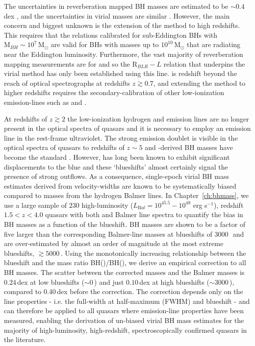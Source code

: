 The uncertainties in reverberation mapped BH masses are estimated to be $\sim 0.4$\,dex \citep[e.g.][]{peterson10}, and the uncertainties in virial masses are similar \citep[e.g.][]{vestergaard06}.
However, the main concern and biggest unknown is the extension of the method to high redshifts. 
This requires that the relations calibrated for sub-Eddington BHs with ${\mathrm M_{BH}}\sim10^7\,{\mathrm M}_\odot$ are valid for BHs with masses up to $10^{10}\,{\mathrm M}_\odot$ that are radiating near the Eddington luminosity. 
Furthermore, the vast majority of reverberation mapping measurements are for \hb and so the ${\mathrm R_{BLR}-L}$ relation that underpins the virial method has only been established using this line.
\hb is redshift beyond the reach of optical spectrographs at redshifts $z \gtrsim 0.7$, and extending the method to higher redshifts requires the secondary-calibration of other low-ionization emission-lines such as \ha and  \citep[e.g.][]{vestergaard02,mclure02,wu04,kollmeier06,onken08,wang09,rafiee11}.

At redshifts of $z\gtrsim 2$ the low-ionization hydrogen and  emission lines are no longer present in the optical spectra of quasars and it is necessary to employ an emission line in the rest-frame ultraviolet.  
The strong  emission doublet is visible in the optical spectra of quasars to redshifts of $z\sim5$ and -derived BH masses have become the standard \citep[e.g.][]{vestergaard06,park13}.
However,  has long been known to exhibit significant displacements to the blue and these `blueshifts' almost certainly signal the presence of strong outflows.
As a consequence, single-epoch virial BH mass estimates derived from  velocity-widths are known to be systematically biased compared to masses from the hydrogen Balmer lines. 
In Chapter~\ref{ch:bhmass}, we use a large sample of $230$ high-luminosity ($L_{\mathrm Bol} = 10^{45.5}-10^{48}$ erg s$^{-1}$), redshift $1.5 < z < 4.0$ quasars with both  and Balmer line spectra to quantify the bias in  BH masses as a function of the  blueshift. 
 BH masses are shown to be a factor of five larger than the corresponding Balmer-line masses at  blueshifts of $3000$\,\kms\, and are over-estimated by almost an order of magnitude at the most extreme blueshifts, $\gtrsim 5000$\,\kms.
Using the monotonically increasing relationship between the  blueshift and the mass ratio BH()/BH(\hans), we derive an empirical correction to all  BH masses.
The scatter between the corrected  masses and the Balmer masses is $0.24$\,dex at low  blueshifts ($\sim0$\,\kms) and just $0.10$\,dex at high blueshifts ($\sim3000$\,\kms), compared to $0.40$\,dex before the correction. 
The correction depends only on the  line properties - i.e. the full-width at half-maximum (FWHM) and blueshift - and can therefore be applied to all quasars where  emission-line properties have been measured, enabling the derivation of un-biased virial BH mass estimates for the majority of high-luminosity, high-redshift, spectroscopically confirmed quasars in the literature.

